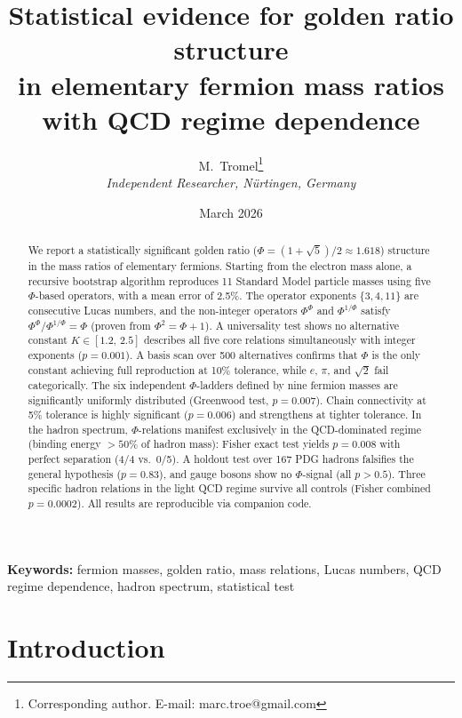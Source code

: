 \documentclass[11pt,a4paper]{article}
\title{%
  Statistical evidence for golden ratio structure\\
  in elementary fermion mass ratios\\
  with QCD regime dependence%
}
\author{%
  M.\ Tromel\thanks{Corresponding author. E-mail: marc.troe@gmail.com}\\[4pt]
  \textit{Independent Researcher, N\"urtingen, Germany}
}
\date{March 2026}
\begin{document}
\maketitle

\begin{abstract}
We report a statistically significant golden ratio
($\Phi = (1{+}\sqrt{5})/2 \approx 1.618$) structure in the mass ratios
of elementary fermions. Starting from the electron mass alone, a
recursive bootstrap algorithm reproduces 11 Standard Model particle
masses using five $\Phi$-based operators, with a mean error of 2.5\%.
The operator exponents $\{3, 4, 11\}$ are consecutive Lucas numbers,
and the non-integer operators $\Phi^\Phi$ and $\Phi^{1/\Phi}$ satisfy
$\Phi^\Phi / \Phi^{1/\Phi} = \Phi$ (proven from $\Phi^2 = \Phi + 1$).
A universality test shows no alternative constant
$K \in [1.2,\, 2.5]$ describes all five core relations simultaneously
with integer exponents ($p = 0.001$). A basis scan over 500 alternatives confirms that
$\Phi$ is the only constant achieving full reproduction at 10\%
tolerance, while $e$, $\pi$, and $\sqrt{2}$ fail categorically.
The six independent $\Phi$-ladders
defined by nine fermion masses are significantly uniformly distributed
(Greenwood test, $p = 0.007$). Chain connectivity at 5\% tolerance is
highly significant ($p = 0.006$) and strengthens at tighter tolerance.
In the hadron spectrum, $\Phi$-relations manifest exclusively in the
QCD-dominated regime (binding energy $> 50\%$ of hadron mass): Fisher
exact test yields $p = 0.008$ with perfect separation (4/4 vs.\ 0/5).
A holdout test over 167 PDG hadrons falsifies the general hypothesis
($p = 0.83$), and gauge bosons show no $\Phi$-signal (all $p > 0.5$).
Three specific hadron relations in the light QCD regime survive all
controls (Fisher combined $p = 0.0002$). All results are reproducible
via companion code.
\end{abstract}

\noindent\textbf{Keywords:}
fermion masses, golden ratio, mass relations, Lucas numbers,
QCD regime dependence, hadron spectrum, statistical test

\section{Introduction}
\label{sec:intro}
\end{document}
